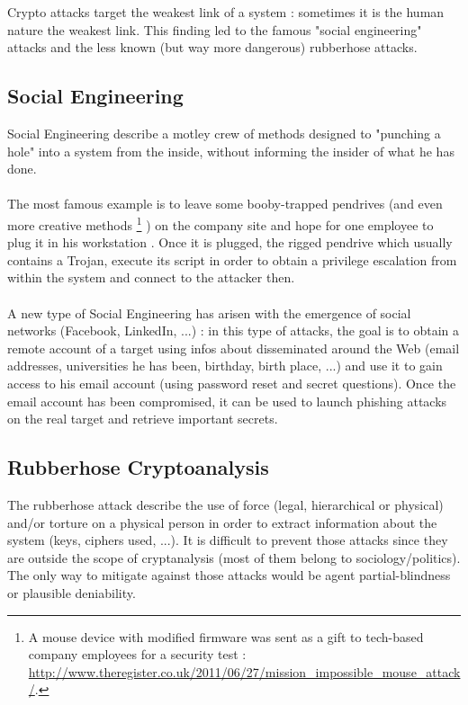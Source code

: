Crypto attacks target the weakest link of a system : sometimes it is the human nature the weakest link. This finding led to the famous "social engineering" attacks and the less known (but way more dangerous) rubberhose attacks.

\subsection{Social Engineering}

Social Engineering describe a motley crew of methods designed to "punching a hole" into a system from the inside, without informing the insider of what he has done. \\\\
The most famous example is to leave some booby-trapped pendrives (and even more creative methods 
\footnote{ A mouse device with modified firmware was sent as a gift to tech-based company employees for a security test : \url{ http://www.theregister.co.uk/2011/06/27/mission_impossible_mouse_attack/}.  }
) on the company site and hope for one employee to plug it in his workstation . Once it is plugged, the rigged pendrive which usually contains a Trojan, execute its script in order to obtain a privilege escalation from within the system and connect to the attacker then.\\\\
A new type of Social Engineering has arisen with the emergence of social networks (Facebook, LinkedIn, ...) : in this type of attacks, the goal is to obtain a remote account of a target using infos about disseminated around the Web (email addresses, universities he has been, birthday, birth place, ...) and use it to gain access to his email account (using password reset and secret questions). Once the email account has been compromised, it can be used to launch phishing attacks on the real target and retrieve important secrets.


\subsection{Rubberhose Cryptoanalysis}

The rubberhose attack describe the use of force (legal, hierarchical or physical) and/or torture on a physical person in order to extract information about the system (keys, ciphers used, ...). It is difficult to prevent those attacks since they are outside the scope of cryptanalysis (most of them belong to sociology/politics). The only way to mitigate against those attacks would be agent partial-blindness or plausible deniability.

